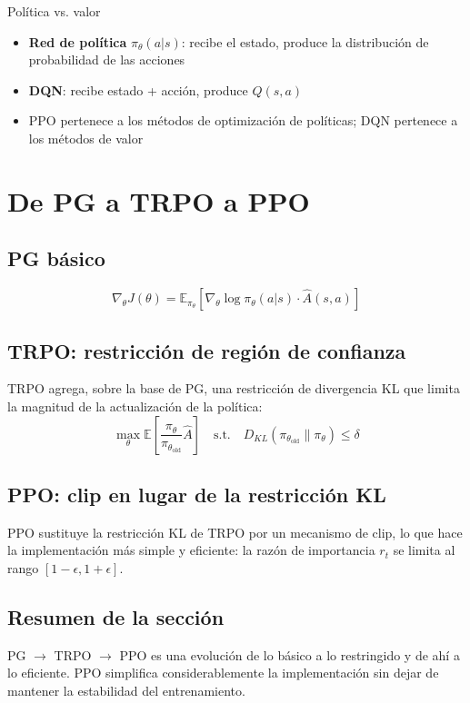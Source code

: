 \documentclass[a4paper]{article}
\begin{document}
\begin{knowledgebox}{Política vs. valor}
\begin{itemize}
  \item \textbf{Red de política} $\pi_\theta(a|s)$: recibe el estado, produce la distribución de probabilidad de las acciones
  \item \textbf{DQN}: recibe estado + acción, produce $Q(s,a)$
  \item PPO pertenece a los métodos de optimización de políticas; DQN pertenece a los métodos de valor
\end{itemize}
\end{knowledgebox}

\section{De PG a TRPO a PPO}
\subsection{PG básico}
$$\nabla_\theta J(\theta) = \mathbb{E}_{\pi_\theta}\left[\nabla_\theta \log \pi_\theta(a|s) \cdot \hat{A}(s,a)\right]$$

\subsection{TRPO: restricción de región de confianza}
TRPO agrega, sobre la base de PG, una restricción de divergencia KL que limita la magnitud de la actualización de la política:
$$\max_\theta \mathbb{E}\left[\frac{\pi_\theta}{\pi_{\theta_\text{old}}} \hat{A}\right] \quad \text{s.t.} \quad D_{KL}(\pi_{\theta_\text{old}} \| \pi_\theta) \le \delta$$

\subsection{PPO: clip en lugar de la restricción KL}
PPO sustituye la restricción KL de TRPO por un mecanismo de clip, lo que hace la implementación más simple y eficiente: la razón de importancia $r_t$ se limita al rango $[1{-}\epsilon, 1{+}\epsilon]$.

\subsection{Resumen de la sección}
PG $\to$ TRPO $\to$ PPO es una evolución de lo básico a lo restringido y de ahí a lo eficiente. PPO simplifica considerablemente la implementación sin dejar de mantener la estabilidad del entrenamiento.
\end{document}
